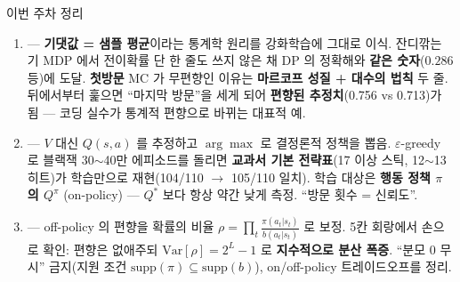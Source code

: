 \begin{frame}{이번 주차 정리}
  \begin{enumerate}
    \item {} --- \textbf{기댓값 = 샘플
      평균}이라는 통계학 원리를 강화학습에 그대로 이식.
      잔디깎는 기 MDP 에서 전이확률 단 한 줄도 쓰지 않은 채
      DP 의 정확해와 \textbf{같은 숫자}($0.286$ 등)에
      도달. \textbf{첫방문} MC 가 무편향인 이유는
      \textbf{마르코프 성질 + 대수의 법칙} 두 줄. 뒤에서부터
      훑으면 ``마지막 방문''을 세게 되어 \textbf{편향된
      추정치}(0.756 vs 0.713)가 됨 --- 코딩 실수가 통계적
      편향으로 바뀌는 대표적 예.
    \item {} --- $V$ 대신 $Q(s,a)$ 를
      추정하고 $\arg\max$ 로 결정론적 정책을 뽑음.
      $\varepsilon$-greedy 로 블랙잭 30$\sim$40만 에피소드를
      돌리면 \textbf{교과서 기본 전략표}(17 이상 스틱,
      12$\sim$13 히트)가 학습만으로 재현(104/110 $\to$ 105/110
      일치). 학습 대상은 \textbf{행동 정책 $\pi$ 의
      $Q^\pi$} (on-policy) --- $Q^{*}$ 보다 항상 약간
      낮게 측정. ``방문 횟수 = 신뢰도''.
    \item {} --- off-policy 의
      편향을 확률의 비율
      $\rho = \prod_t \frac{\pi(a_t|s_t)}{b(a_t|s_t)}$
      로 보정. 5칸 회랑에서 손으로 확인: 편향은 없애주되
      $\text{Var}[\rho] = 2^L - 1$ 로 \textbf{지수적으로
      분산 폭증}. ``분모 0 무시'' 금지(지원 조건
      $\text{supp}(\pi) \subseteq \text{supp}(b)$),
      on/off-policy 트레이드오프를 정리.
  \end{enumerate}
\end{frame}

